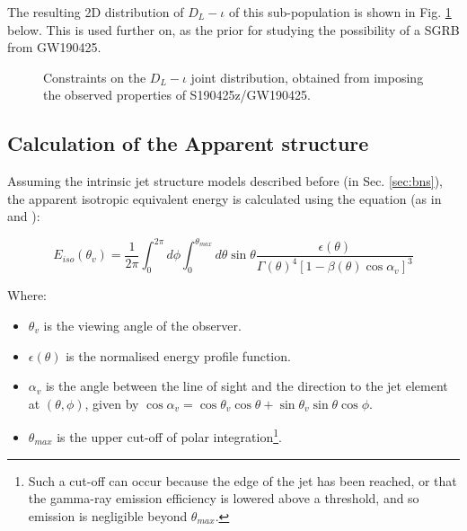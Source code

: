         The resulting 2D distribution of $D_L-\iota$ of this sub-population is shown in
        Fig. \ref{fig:dl_iota} below. This is used further on, as the prior for studying
        the possibility of a SGRB from GW190425.

    \begin{figure}[H]
        \centering
        \def\svgwidth{0.9\textwidth}
        
        \caption[$D_L-\iota$ Posterior distribution.]
        {
            Constraints on the $D_L-\iota$ joint distribution, obtained from
            imposing the observed properties of S190425z/GW190425.
        }
        \label{fig:dl_iota}
    \end{figure}

    \subsection{Calculation of the Apparent structure}

    Assuming the intrinsic jet structure models described before (in Sec.
    \ref{sec:bns}), the apparent isotropic equivalent energy is calculated using the
    equation (as in \cite{salafia_2015} and
    \cite{biscoveanu_2020}):

     \begin{equation}
         \label{eq:6}
         E_{iso}(\theta_v) =
             \dfrac{1}{2\pi}
             \int_{0}^{2\pi} d\phi \int_{0}^{\theta_{max}} d\theta
             \sin \theta
             \dfrac{\epsilon(\theta)}{\Gamma(\theta)^4
             [1 - \beta(\theta) \cos \alpha_v]^3}
     \end{equation}

    Where:
    \begin{itemize}

        \item $\theta_v$ is the viewing angle of the observer.

        \item $\epsilon(\theta)$ is the normalised energy profile function.

        \item $\alpha_v$ is the angle between the line of sight and the direction to the
            jet element at $(\theta, \phi)$, given by $\cos \alpha_v = \cos \theta_v
            \cos \theta + \sin \theta_v \sin \theta \cos \phi$.

        \item $\theta_{max}$ is the upper cut-off of polar integration\footnote
            {
                Such a cut-off can occur because the edge of the jet has been reached,
                or that the gamma-ray emission efficiency is lowered above a threshold,
                and so emission is negligible beyond $\theta_{max}$.
            }.

    \end{itemize}

